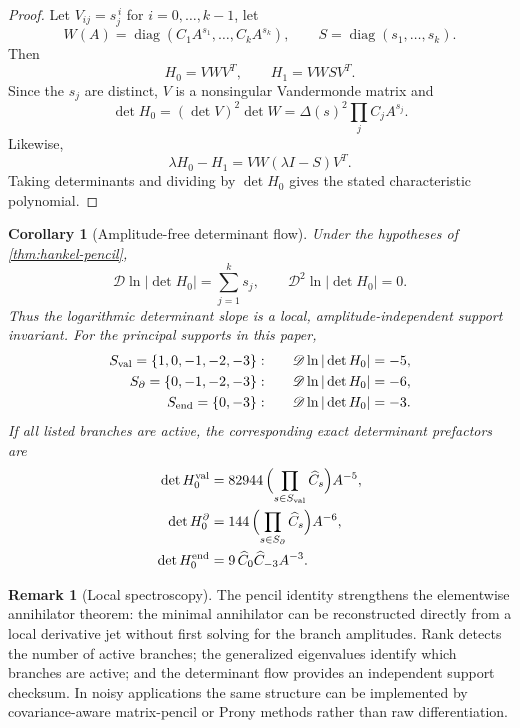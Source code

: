 \documentclass[aps,prd,preprint,onecolumn,nofootinbib,superscriptaddress,showkeys]{revtex4-2}
\numberwithin{equation}{section}
\theoremstyle{definition}
\newtheorem{remark}{Remark}[section]
\theoremstyle{plain}
\newtheorem{corollary}{Corollary}[section]
\newcommand{\Dil}{\mathscr D}
\newcommand{\diag}{\operatorname{diag}}
\begin{document}
\begin{proof}
Let $V_{ij}=s_j^{\,i}$ for $i=0,\ldots,k-1$, let
\[
W(A)=\diag(C_1A^{s_1},\ldots,C_kA^{s_k}),
\qquad
S=\diag(s_1,\ldots,s_k).
\]
Then
\begin{equation}
H_0=VWV^T,
\qquad
H_1=VWSV^T.
\end{equation}
Since the $s_j$ are distinct, $V$ is a nonsingular Vandermonde matrix and
\[
\det H_0=(\det V)^2\det W
=\Delta(s)^2\prod_j C_jA^{s_j}.
\]
Likewise,
\[
\lambda H_0-H_1
=VW(\lambda I-S)V^T.
\]
Taking determinants and dividing by $\det H_0$ gives the stated characteristic polynomial.
\end{proof}

\begin{corollary}[Amplitude-free determinant flow]\label{cor:det-flow}
Under the hypotheses of \cref{thm:hankel-pencil},
\begin{equation}
\boxed{
\Dil\ln|\det H_0|
=
\sum_{j=1}^{k}s_j,
\qquad
\Dil^2\ln|\det H_0|=0.
}
\end{equation}
Thus the logarithmic determinant slope is a local, amplitude-independent support invariant.  For the principal supports in this paper,
\begin{align}
S_{\rm val}=\{1,0,-1,-2,-3\}:&\qquad
\Dil\ln|\det H_0|=-5,
\\
S_{\partial}=\{0,-1,-2,-3\}:&\qquad
\Dil\ln|\det H_0|=-6,
\\
S_{\rm end}=\{0,-3\}:&\qquad
\Dil\ln|\det H_0|=-3.
\end{align}
If all listed branches are active, the corresponding exact determinant prefactors are
\begin{align}
\det H_0^{\rm val}
&=82944\,\Bigl(\prod_{s\in S_{\rm val}}\widehat C_s\Bigr)A^{-5},\\
\det H_0^{\partial}
&=144\,\Bigl(\prod_{s\in S_\partial}\widehat C_s\Bigr)A^{-6},\\
\det H_0^{\rm end}
&=9\,\widehat C_0\widehat C_{-3}A^{-3}.
\end{align}
\end{corollary}

\begin{remark}[Local spectroscopy]
The pencil identity strengthens the elementwise annihilator theorem: the minimal annihilator can be reconstructed directly from a local derivative jet without first solving for the branch amplitudes.  Rank detects the number of active branches; the generalized eigenvalues identify which branches are active; and the determinant flow provides an independent support checksum.  In noisy applications the same structure can be implemented by covariance-aware matrix-pencil or Prony methods rather than raw differentiation.
\end{remark}
\end{document}
